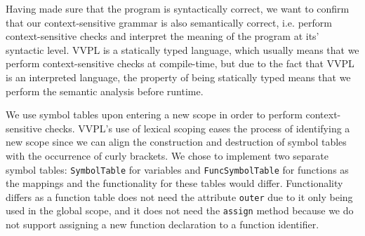Having made sure that the program is syntactically correct, we want to confirm that our context-sensitive grammar is also semantically correct, 
i.e. perform context-sensitive checks and interpret the meaning of the program at its' syntactic level.
VVPL is a statically typed language, which usually means that we perform context-sensitive checks at compile-time, but due to the fact that VVPL is an interpreted language,
the property of being statically typed means that we perform the semantic analysis before runtime.


We use symbol tables upon entering a new scope in order to perform context-sensitive checks. VVPL's use of lexical scoping eases the process of identifying a new scope since we can align the construction
and destruction of symbol tables with the occurrence of curly brackets.
We chose to implement two separate symbol tables: \verb|SymbolTable| for variables and \verb|FuncSymbolTable| for functions as the mappings and the functionality for these tables would differ.
Functionality differs as a function table does not need the attribute \verb|outer| due to it only being used in the global scope, and it does not need the \verb|assign| method because we do not support assigning a new function declaration to a function identifier.

